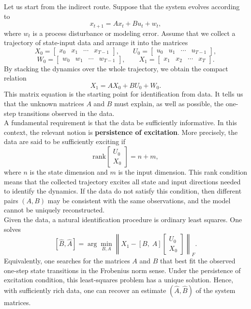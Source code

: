 Let us start from the indirect route. Suppose that the system evolves according to
\[
x_{t+1} = A x_t + B u_t + w_t,
\]
where $w_t$ is a process disturbance or modeling error. Assume that we collect a trajectory of
state-input data and arrange it into the matrices
\[
X_0 = \begin{bmatrix} x_0 & x_1 & \cdots & x_{T-1} \end{bmatrix},
\qquad
U_0 = \begin{bmatrix} u_0 & u_1 & \cdots & u_{T-1} \end{bmatrix},
\]
\[
W_0 = \begin{bmatrix} w_0 & w_1 & \cdots & w_{T-1} \end{bmatrix},
\qquad
X_1 = \begin{bmatrix} x_1 & x_2 & \cdots & x_T \end{bmatrix}.
\]
By stacking the dynamics over the whole trajectory, we obtain the compact relation
\[
X_1 = A X_0 + B U_0 + W_0.
\]
This matrix equation is the starting point for identification from data. It tells us that the
unknown matrices $A$ and $B$ must explain, as well as possible, the one-step transitions
observed in the data.\\
A fundamental requirement is that the data be sufficiently informative. In this context, the
relevant notion is \textbf{persistence of excitation}. More precisely, the data are said to be
sufficiently exciting if
\[
\text{rank}\!\begin{bmatrix}
U_0\\[0.3em]
X_0
\end{bmatrix}
= n+m,
\]
where $n$ is the state dimension and $m$ is the input dimension.
This rank condition means that the collected trajectory excites all state and input directions
needed to identify the dynamics. If the data do not satisfy this condition, then different pairs
$(A,B)$ may be consistent with the same observations, and the model cannot be uniquely
reconstructed.\\

Given the data, a natural identification procedure is ordinary least squares. One solves
\[
[\hat B,\hat A]
=
\arg\min_{B,A}
\left\|
X_1 - [B,\;A]
\begin{bmatrix}
U_0\\[0.3em]
X_0
\end{bmatrix}
\right\|_F.
\]
Equivalently, one searches for the matrices $A$ and $B$ that best fit the observed one-step
state transitions in the Frobenius norm sense. Under the persistence of excitation condition, this
least-squares problem has a unique solution. Hence, with sufficiently rich data, one can recover
an estimate $(\hat A,\hat B)$ of the system matrices.


